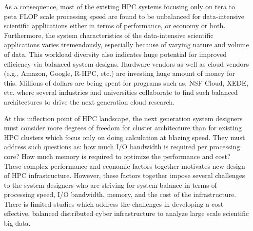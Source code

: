 \documentclass[journal]{IEEEtran}
\begin{document}

As a consequence, most of the existing HPC systems focusing only on tera to peta FLOP scale processing speed are found to be unbalanced for data-intensive scientific applications either in terms of performance, or economy or both. Furthermore, the system characteristics of the data-intensive scientific applications varies tremendously, especially because of varying nature and volume of data. This workload diversity also indicates huge potential for improved efficiency via balanced system designs.  Hardware vendors as well as cloud vendors (e.g., Amazon, Google, R-HPC, etc.) are investing huge amount of money for this. Millions of dollars are being spent for programs such as, NSF Cloud, XEDE, etc. where several industries and universities collaborate to find such balanced architectures to drive the next generation cloud research. 

At this inflection point of HPC landscape, the next generation system designers must consider more degrees of freedom for cluster architecture than for existing HPC clusters which focus only on doing calculation at blazing speed. They must address such questions as: how much I/O bandwidth is required per processing core? How much memory is required to optimize the performance and cost? These complex performance and economic factors together motivates new design of HPC infrastructure. However, these factors together impose several challenges to the system designers who are striving for system balance in terms of processing speed, I/O bandwidth, memory, and the cost of the infrastructure. There is limited studies which address the challenges in developing a cost effective, balanced distributed cyber infrastructure to analyze large scale scientific big data. 
 
\end{document}
